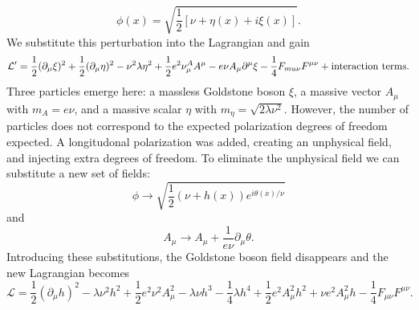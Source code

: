 \begin{equation}
\phi(x) =\sqrt{\frac{1}{2}[\nu+\eta(x)+i\xi(x)]}.
\end{equation}
We substitute this perturbation into the Lagrangian and gain
\begin{equation}
\mathcal{L}'=\frac{1}{2}(\partial_\mu\xi)^2+\frac{1}{2}(\partial_\mu\eta)^2-\nu^2\lambda\eta^2+\frac{1}{2}e^2\nu^A_\mu A^\mu-e\nu A_\mu \partial^\mu\xi-\frac{1}{4}F_{mu\nu}F^{\mu\nu} + \textnormal{interaction terms}.
\end{equation}
Three particles emerge here: a massless Goldstone boson $\xi$, a massive vector $A_\mu$ with $m_A=e\nu$, and a massive scalar $\eta$ with $m_\eta=\sqrt{2\lambda\nu^2}$. However, the number of particles does not correspond to the expected polarization degrees of freedom expected. A longitudonal polarization was added, creating an unphysical field, and injecting extra degrees of freedom. To eliminate the unphysical field we can substitute a new set of fields:
\begin{equation}
\phi \rightarrow \sqrt{\frac{1}{2}(\nu+h(x))e^{i\theta(x)/\nu}}
\end{equation}
and 
\begin{equation}
A_\mu \rightarrow A_\mu + \frac{1}{e\nu} \partial_\mu\theta.
\end{equation}
Introducing these substitutions, the Goldstone boson field disappears and the new Lagrangian becomes 
\begin{equation}
\mathcal{L} = \frac{1}{2}(\partial_\mu h)^2 -\lambda\nu^2h^2+\frac{1}{2}e^2\nu^2A_\mu^2-\lambda\nu h^3-\frac{1}{4}\lambda h^4+\frac{1}{2}e^2A_\mu^2h^2+\nu e^2A_\mu^2h-\frac{1}{4}F_{\mu\nu}F^{\mu\nu}.
\end{equation}
